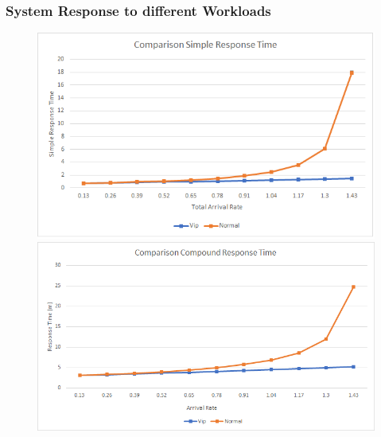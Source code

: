 
\subsubsection{System Response to different Workloads}

\begin{figure}[h!]
  \begin{minipage}{0.48\textwidth}
    \centering
    \includegraphics[width=\textwidth]{figs/workloadSimple.png}
    \caption{}  %
    \label{}
  \end{minipage}\hspace{0.03\textwidth}
  \begin{minipage}{0.48\textwidth}
    \centering
    \includegraphics[width=\textwidth]{figs/workloadCompound.png}
    \caption{} %
    \label{}
  \end{minipage}
\end{figure}

